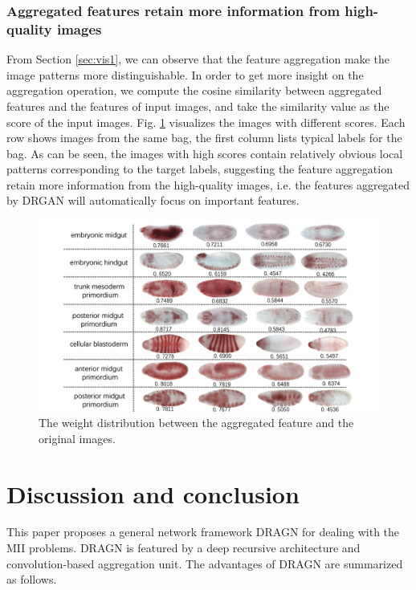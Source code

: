 \documentclass[10pt,twocolumn,letterpaper]{article}
\begin{document}
\subsubsection{Aggregated features retain more information from high-quality images}
From Section \ref{sec:vis1}, we can observe that the feature aggregation make the image patterns more distinguishable. In order to
get more insight on the aggregation operation, we compute the cosine similarity between aggregated features and the features of input images, and take the similarity value as the score of the input images. Fig. \ref{fig:vis2} visualizes the images with different scores. Each row shows images from the same bag, the first column lists typical labels for the bag. As can be seen, the images with high scores contain relatively obvious local patterns corresponding to
the target labels, suggesting the feature aggregation retain more information from the high-quality images, i.e.  the features aggregated by DRGAN will automatically focus on important features.


\begin{figure}
\begin{center}
\includegraphics[width=0.8\linewidth]{flycompare.pdf}
\end{center}
   \caption{The weight distribution between the aggregated feature and the original images.}
\label{fig:vis2}
\end{figure}



\section{Discussion and conclusion}
This paper proposes a general network framework DRAGN for dealing with the MII problems. DRAGN is featured by a deep recursive architecture and convolution-based aggregation unit. The advantages of DRAGN are summarized as follows.
\end{document}
